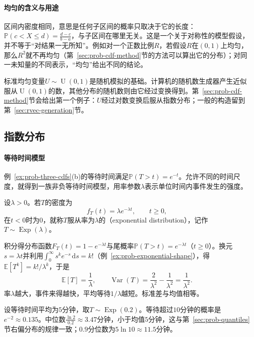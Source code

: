 \paragraph{均匀的含义与用途}
区间内密度相同，意思是任何子区间的概率只取决于它的长度：$\mathbb{P}(c<X\leq d)=\frac{d-c}{b-a}$，与子区间在哪里无关。这是一个关于对称性的模型假设，并不等于“对结果一无所知”。例如对一个正数比例$R$，若假设$R$在$(0,1)$上均匀，那么$R^2$就不再均匀（第~\ref{sec:prob-cdf-method}节的方法可以算出它的分布）；对同一未知量的不同表示，“均匀”给出不同的结论。

标准均匀变量$U\sim\operatorname{U}(0,1)$是随机模拟的基础。计算机的随机数生成器产生近似服从$\operatorname{U}(0,1)$的数，其他分布的随机数则由它经过变换得到。第~\ref{sec:prob-cdf-method}节会给出第一个例子：$U$经过对数变换后服从指数分布；一般的构造留到第~\ref{sec:rvec-generation}节。

\subsection{指数分布}
\label{sec:prob-exponential}

\paragraph{等待时间模型}
例~\ref{ex:prob-three-cdfs}(b)的等待时间满足$\mathbb{P}(T>t)=e^{-t}$。允许不同的时间尺度，就得到一族非负等待时间模型，用率参数$\lambda$表示单位时间内事件发生的强度。

\begin{definition}[指数分布]
\label{def:prob-exponential}
设$\lambda>0$。若$T$的密度为
\[
  f_T(t)=\lambda e^{-\lambda t},\qquad t\geq0,
\]
在$t<0$时为$0$，就称$T$服从率为$\lambda$的（exponential distribution），记作$T\sim\operatorname{Exp}(\lambda)$。
\end{definition}

积分得分布函数$F_T(t)=1-e^{-\lambda t}$与尾概率$\mathbb{P}(T>t)=e^{-\lambda t}$（$t\geq0$）。换元$s=\lambda t$并利用$\int_0^\infty s^ke^{-s}\,\mathrm{d}s=k!$（例~\ref{ex:prob-exponential-shape}），得$\mathbb{E}[T^k]=k!/\lambda^k$，于是
\[
  \mathbb{E}[T]=\frac1\lambda,\qquad \operatorname{Var}(T)=\frac{2}{\lambda^2}-\frac1{\lambda^2}=\frac1{\lambda^2}.
\]
率$\lambda$越大，事件来得越快，平均等待$1/\lambda$越短。标准差与均值相等。

\begin{example}[窗口等待]
\label{ex:prob-exponential-wait}
设等待时间平均为$5$分钟，取$T\sim\operatorname{Exp}(0.2)$。等待超过$10$分钟的概率是$e^{-2}\approx0.135$。中位数$\frac{\ln2}{0.2}\approx3.47$分钟，小于均值$5$分钟，这与第~\ref{sec:prob-quantiles}节右偏分布的规律一致；$0.9$分位数为$5\ln10\approx11.5$分钟。
\end{example}

